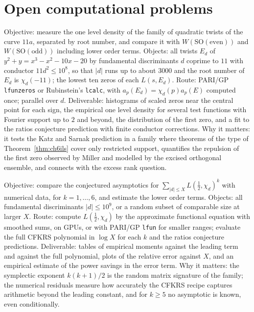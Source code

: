 \section{Open computational problems}

\begin{compproblem}
Objective: measure the one level density of the family of quadratic twists of the curve $11a$, separated by root number, and compare it with $W(\mathrm{SO(even)})$ and $W(\mathrm{SO(odd)})$ including lower order terms. Objects: all twists $E_d$ of $y^2+y=x^3-x^2-10x-20$ by fundamental discriminants $d$ coprime to $11$ with conductor $11d^2\le10^8$, so that $|d|$ runs up to about $3000$ and the root number of $E_d$ is $\chi_d(-11)$; the lowest ten zeros of each $L(s,E_d)$. Route: PARI/GP \texttt{lfunzeros} or Rubinstein's \texttt{lcalc}, with $a_p(E_d)=\chi_d(p)a_p(E)$ computed once; parallel over $d$. Deliverable: histograms of scaled zeros near the central point for each sign, the empirical one level density for several test functions with Fourier support up to $2$ and beyond, the distribution of the first zero, and a fit to the ratios conjecture prediction with finite conductor corrections. Why it matters: it tests the Katz and Sarnak prediction in a family where theorems of the type of Theorem~\ref{thm:ch6ils} cover only restricted support, quantifies the repulsion of the first zero observed by Miller and modelled by the excised orthogonal ensemble, and connects with the excess rank question.
\end{compproblem}

\begin{compproblem}
Objective: compare the conjectured asymptotics for $\sum_{|d|\le X}L(\frac12,\chi_d)^k$ with numerical data, for $k=1,\dots,6$, and estimate the lower order terms. Objects: all fundamental discriminants $|d|\le10^9$, or a random subset of comparable size at larger $X$. Route: compute $L(\frac12,\chi_d)$ by the approximate functional equation with smoothed sums, on GPUs, or with PARI/GP \texttt{lfun} for smaller ranges; evaluate the full CFKRS polynomial in $\log X$ for each $k$ and the ratios conjecture predictions. Deliverable: tables of empirical moments against the leading term and against the full polynomial, plots of the relative error against $X$, and an empirical estimate of the power savings in the error term. Why it matters: the symplectic exponent $k(k+1)/2$ is the random matrix signature of the family; the numerical residuals measure how accurately the CFKRS recipe captures arithmetic beyond the leading constant, and for $k\ge5$ no asymptotic is known, even conditionally.
\end{compproblem}

